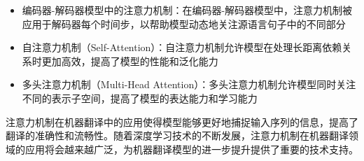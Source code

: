 \documentclass[withoutpreface,bwprint]{cumcmthesis} %
\begin{document}
\begin{itemize}
    \item 编码器-解码器模型中的注意力机制：在编码器-解码器模型中，注意力机制被应用于解码器每个时间步，以帮助模型动态地关注源语言句子中的不同部分
    \item 自注意力机制（Self-Attention）：自注意力机制允许模型在处理长距离依赖关系时更加高效，提高了模型的性能和泛化能力
    \item 多头注意力机制（Multi-Head Attention）：多头注意力机制允许模型同时关注不同的表示子空间，提高了模型的表达能力和学习能力
\end{itemize}

注意力机制在机器翻译中的应用使得模型能够更好地捕捉输入序列的信息，提高了翻译的准确性和流畅性。随着深度学习技术的不断发展，注意力机制在机器翻译领域的应用将会越来越广泛，为机器翻译模型的进一步提升提供了重要的技术支持。
\end{document}
